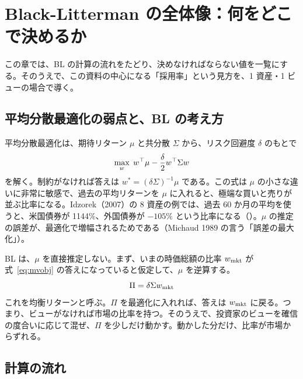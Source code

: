 \chapter{Black-Litterman の全体像：何をどこで決めるか}\label{ch:overview}

この章では、BL の計算の流れをたどり、決めなければならない値を一覧にする。そのうえで、この資料の中心になる「採用率」という見方を、1 資産・1 ビューの場合で導く。

\section{平均分散最適化の弱点と、BL の考え方}

平均分散最適化は、期待リターン $\mu$ と共分散 $\Sigma$ から、リスク回避度 $\delta$ のもとで
\begin{equation}
\max_w\; w^{\top}\mu-\frac{\delta}{2}w^{\top}\Sigma w
\label{eq:mvobj}
\end{equation}
を解く。制約がなければ答えは $w^*=(\delta\Sigma)^{-1}\mu$ である。この式は $\mu$ の小さな違いに非常に敏感で、過去の平均リターンを $\mu$ に入れると、極端な買いと売りが並ぶ比率になる。Idzorek（2007）の 8 資産の例では、過去 60 か月の平均を使うと、米国債券が 1144\%、外国債券が $-105\%$ という比率になる（）。$\mu$ の推定の誤差が、最適化で増幅されるためである（Michaud 1989 の言う「誤差の最大化」）。

BL は、$\mu$ を直接推定しない。まず、いまの時価総額の比率 $w_{\mathrm{mkt}}$ が式~\eqref{eq:mvobj} の答えになっていると仮定して、$\mu$ を逆算する。
\begin{equation}
\Pi=\delta\Sigma w_{\mathrm{mkt}}
\label{eq:pi}
\end{equation}
これを均衡リターンと呼ぶ。$\Pi$ を最適化に入れれば、答えは $w_{\mathrm{mkt}}$ に戻る。つまり、ビューがなければ市場の比率を持つ。そのうえで、投資家のビューを確信の度合いに応じて混ぜ、$\Pi$ を少しだけ動かす。動かした分だけ、比率が市場からずれる。

\section{計算の流れ}

